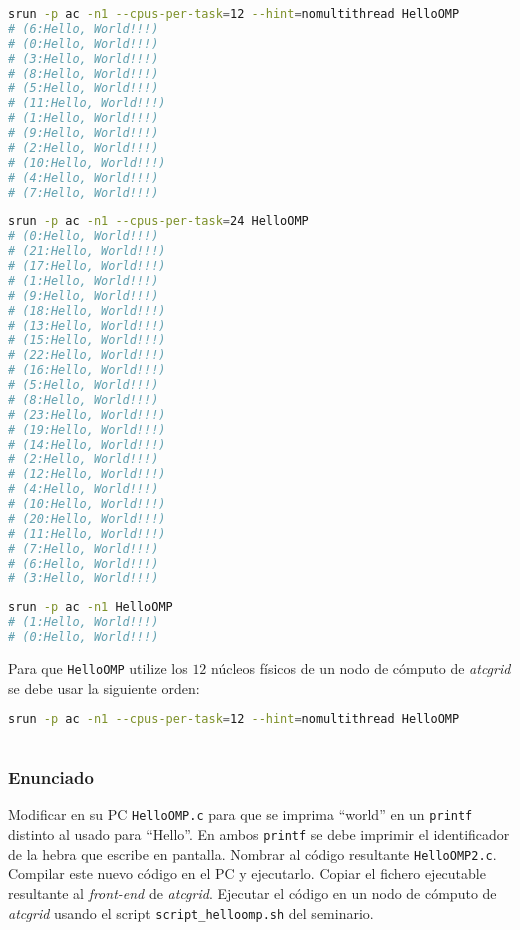 \begin{lstlisting}[language=sh]
srun -p ac -n1 --cpus-per-task=12 --hint=nomultithread HelloOMP
# (6:Hello, World!!!)
# (0:Hello, World!!!)
# (3:Hello, World!!!)
# (8:Hello, World!!!)
# (5:Hello, World!!!)
# (11:Hello, World!!!)
# (1:Hello, World!!!)
# (9:Hello, World!!!)
# (2:Hello, World!!!)
# (10:Hello, World!!!)
# (4:Hello, World!!!)
# (7:Hello, World!!!)
\end{lstlisting}

\pagebreak

\begin{lstlisting}[language=sh]
srun -p ac -n1 --cpus-per-task=24 HelloOMP
# (0:Hello, World!!!)
# (21:Hello, World!!!)
# (17:Hello, World!!!)
# (1:Hello, World!!!)
# (9:Hello, World!!!)
# (18:Hello, World!!!)
# (13:Hello, World!!!)
# (15:Hello, World!!!)
# (22:Hello, World!!!)
# (16:Hello, World!!!)
# (5:Hello, World!!!)
# (8:Hello, World!!!)
# (23:Hello, World!!!)
# (19:Hello, World!!!)
# (14:Hello, World!!!)
# (2:Hello, World!!!)
# (12:Hello, World!!!)
# (4:Hello, World!!!)
# (10:Hello, World!!!)
# (20:Hello, World!!!)
# (11:Hello, World!!!)
# (7:Hello, World!!!)
# (6:Hello, World!!!)
# (3:Hello, World!!!)
\end{lstlisting}

\begin{lstlisting}[language=sh]
srun -p ac -n1 HelloOMP
# (1:Hello, World!!!)
# (0:Hello, World!!!)
\end{lstlisting}

Para que \texttt{HelloOMP} utilize los $12$ núcleos físicos de un nodo de cómputo de \textit{atcgrid} se debe usar la siguiente orden:

\begin{lstlisting}[language=sh]
srun -p ac -n1 --cpus-per-task=12 --hint=nomultithread HelloOMP
\end{lstlisting}

\section{}\label{ej1-4}

\subsubsection{Enunciado}

Modificar en su PC \texttt{HelloOMP.c} para que se imprima ``world'' en un \texttt{printf} distinto al usado para ``Hello''.
En ambos \texttt{printf} se debe imprimir el identificador de la hebra que escribe en pantalla.
Nombrar al código resultante \texttt{HelloOMP2.c}.
Compilar este nuevo código en el PC y ejecutarlo.
Copiar el fichero ejecutable resultante al \textit{front-end} de \textit{atcgrid}.
Ejecutar el código en un nodo de cómputo de \textit{atcgrid} usando el script \texttt{script\_helloomp.sh} del seminario.

